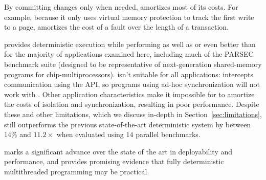 By committing changes only when needed, \dthreads{} amortizes most of its costs.
For example, because it only uses virtual memory protection to track the first
write to a page, \dthreads{} amortizes the cost of a fault over the length of a
transaction.

\dthreads{} provides deterministic execution while performing as well as or even
better than \pthreads{} for the majority of applications examined here, including much of the PARSEC benchmark suite (designed to be representative of
next-generation shared-me\-mory programs for chip-multiprocessors).   \dthreads{} isn't suitable for all applications:  \dthreads{} intercepts communication using the \pthreads{} API, so programs using ad-hoc synchronization will not work with \dthreads{}.  Other application characteristics make it impossible for \dthreads{} to amortize the costs of isolation and synchronization, resulting in poor performance.  Despite these and other limitations, which we discuss in-depth in Section~\ref{sec:limitations}, \dthreads{} still outperforms 
the previous state-of-the-art deterministic system by between 14\% and 
$11.2\times$ when evaluated using $14$ parallel benchmarks.

\dthreads{} marks a significant advance over the state of the art in
deployability and performance, and provides promising evidence that fully
deterministic multithreaded programming may be practical.





